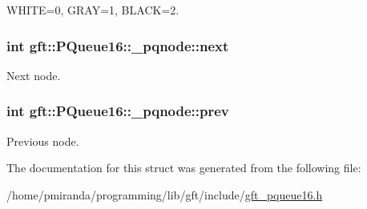 W\+H\+I\+TE=0, G\+R\+AY=1, B\+L\+A\+CK=2. 

\subsubsection[{\texorpdfstring{next}{next}}]{\setlength{\rightskip}{0pt plus 5cm}int gft\+::\+P\+Queue16\+::\+\_\+pqnode\+::next}\hypertarget{structgft_1_1PQueue16_1_1__pqnode_ae134e5ac0719e6f167a30bc0f6db8c82}{}\label{structgft_1_1PQueue16_1_1__pqnode_ae134e5ac0719e6f167a30bc0f6db8c82}


Next node. 

\subsubsection[{\texorpdfstring{prev}{prev}}]{\setlength{\rightskip}{0pt plus 5cm}int gft\+::\+P\+Queue16\+::\+\_\+pqnode\+::prev}\hypertarget{structgft_1_1PQueue16_1_1__pqnode_a3f2d4b2b31360fd45e1f61cde5ebec41}{}\label{structgft_1_1PQueue16_1_1__pqnode_a3f2d4b2b31360fd45e1f61cde5ebec41}


Previous node. 



The documentation for this struct was generated from the following file\+:\begin{DoxyCompactItemize}
\item 
/home/pmiranda/programming/lib/gft/include/\hyperlink{gft__pqueue16_8h}{gft\+\_\+pqueue16.\+h}\end{DoxyCompactItemize}

